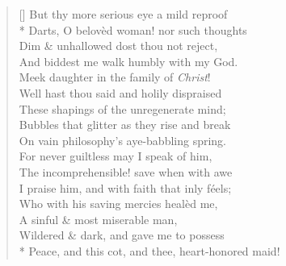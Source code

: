 \documentclass[MAIN]{subfiles}
\begin{document}
\begin{verse}[\versewidth]
But thy more serious eye a mild reproof\\*
Darts, O belov\`ed woman! nor such thoughts\\
Dim \& unhallowed dost thou not reject,\\
And biddest me walk humbly with my God.\\
Meek daughter in the family of \emph{Christ}!\\
Well hast thou said and holily dispraised\\
These shapings of the unregenerate mind;\\
Bubbles that glitter as they rise and break\\
On vain philosophy's aye-babbling spring.\\ 
For never guiltless may I speak of him,\\
The incomprehensible! save when with awe\\
I praise him, and with faith that inly f\'eels;\\
Who with his saving mercies heal\`ed me,\\
A sinful \& most miserable man,\\ 
Wildered \& dark, and gave me to possess\\*
Peace, and this cot, and thee, heart-honored maid! 
\end{verse}
\end{document}
